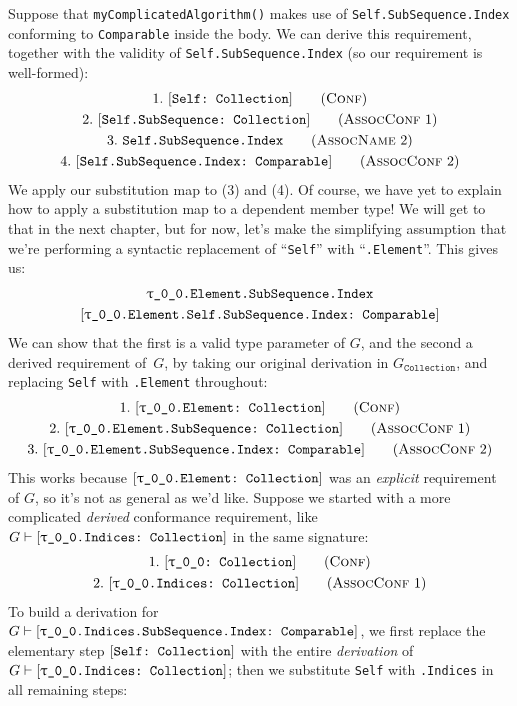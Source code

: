 \documentclass[../generics]{subfiles}
\begin{document}
Suppose that \texttt{myComplicatedAlgorithm()} makes use of \texttt{Self.SubSequence.Index} conforming to \texttt{Comparable} inside the body. We can derive this requirement, together with the validity of \texttt{Self.SubSequence.Index} (so our requirement is well-formed):
\begin{gather*}
\ConfStep{Self}{Collection}{1}\\
\AssocConfStep{1}{Self.SubSequence}{Collection}{2}\\
\AssocNameStep{2}{Self.SubSequence.Index}{3}\\
\AssocConfStep{2}{Self.SubSequence.Index}{Comparable}{4}
\end{gather*}
We apply our substitution map to (3) and (4). Of course, we have yet to explain how to apply a substitution map to a dependent member type! We will get to that in the next chapter, but for now, let's make the simplifying assumption that we're performing a syntactic replacement of ``\texttt{Self}'' with ``\texttt{\rT.Element}''. This gives us:
\begin{gather*}
\texttt{\rT.Element.SubSequence.Index}\\
\ConfReq{\rT.Element.Self.SubSequence.Index}{Comparable}
\end{gather*}
We can show that the first is a valid type parameter of $G$, and the second a derived requirement of~$G$, by taking our original derivation in $G_\texttt{Collection}$, and replacing \texttt{Self} with \texttt{\rT.Element} throughout:
\begin{gather*}
\ConfStep{\rT.Element}{Collection}{1}\\
\AssocConfStep{1}{\rT.Element.SubSequence}{Collection}{2}\\
\AssocConfStep{2}{\rT.Element.SubSequence.Index}{Comparable}{3}
\end{gather*}
This works because $[\texttt{\texttt{$\uptau$\_0\_0}.Element:~Collection}]$ was an \emph{explicit} requirement of $G$, so it's not as general as we'd like. Suppose we started with a more complicated \emph{derived} conformance requirement, like $G\vdash[\texttt{\texttt{$\uptau$\_0\_0}.Indices:~Collection}]$ in the same signature:
\begin{gather*}
\ConfStep{\rT}{Collection}{1}\\
\AssocConfStep{1}{\rT.Indices}{Collection}{2}
\end{gather*}
To build a derivation for $G\vdash[\texttt{\texttt{$\uptau$\_0\_0}.Indices.SubSequence.Index:~Comparable}]$, we first replace the elementary step $[\texttt{Self:~Collection}]$ with the entire \emph{derivation} of $G\vdash[\texttt{\texttt{$\uptau$\_0\_0}.Indices:~Collection}]$; then we substitute \texttt{Self} with \texttt{\rT.Indices} in all remaining steps:
\end{document}
